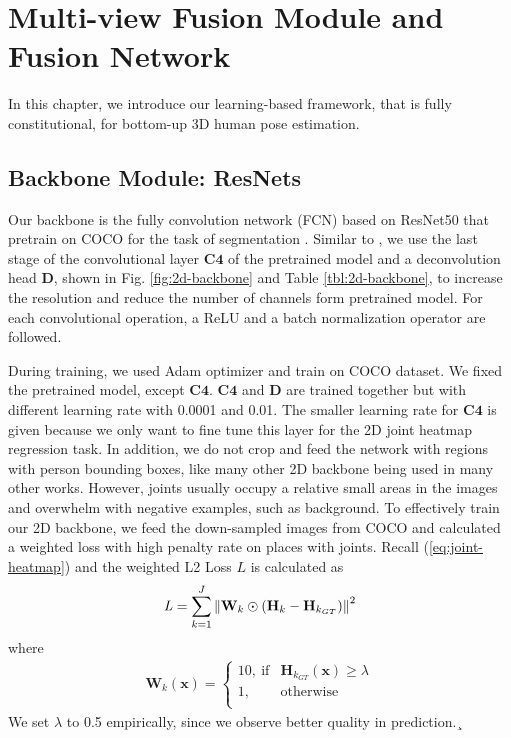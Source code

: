 \chapter{Multi-view Fusion Module and Fusion Network}
In this chapter, we introduce our learning-based framework, that is fully constitutional, for bottom-up 3D human pose estimation. 
\section{Backbone Module: ResNets}
Our backbone is the fully convolution network (FCN) based on ResNet50 that pretrain on COCO for the task of segmentation \cite{resnet50}. Similar to \cite{xiao2018simple}, we use the last stage of the convolutional layer $\bm{C4}$ of the pretrained model and a deconvolution head $\bm{D}$, shown in Fig. \ref{fig:2d-backbone} and Table \ref{tbl:2d-backbone}, to increase the resolution and reduce the number of channels form pretrained model. For each convolutional operation, a ReLU and a batch normalization operator are followed.

During training, we used Adam optimizer and train on COCO dataset. We fixed the pretrained model, except $\bm{C4}$. $\bm{C4}$ and $\bm{D}$ are trained together but with different learning rate with 0.0001 and 0.01. The smaller learning rate for $\bm{C4}$ is given because we only want to fine tune this layer for the 2D joint heatmap regression task. In addition, we do not crop and feed the network with regions with person bounding boxes, like many other 2D backbone being used in many other works. However, joints usually occupy a relative small areas in the images and overwhelm with negative examples, such as background. To effectively train our 2D backbone, we feed the down-sampled images from COCO and calculated a weighted loss with high penalty rate on places with joints. Recall (\ref{eq:joint-heatmap}) and the weighted L2 Loss $\mathit{L}$ is calculated as 
\begin{gather}
\mathit{L} = \sum_{k=1}^J\left\lVert\mathbf{W}_k \odot \left(\mathbf{H}_k - \mathbf{H}_{k_{GT}}\right)\right\rVert^2
\label{eq:joint-heatmap}
\end{gather}
where
\begin{gather}
\mathbf{W}_k(\mathbf{x}) = 
\begin{cases}
	10,\ \text{if} & \mathbf{H}_{k_{GT}}(\mathbf{x})\geq \lambda \\ 
	1,& \text{otherwise}\\
\end{cases}
\end{gather}
We set $\lambda$ to 0.5 empirically, since we observe better quality in prediction.¸


